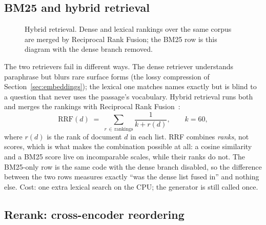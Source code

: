 \subsection{BM25 and hybrid retrieval}
\label{sec:arch-hybrid}

\begin{figure}[t]
\centering
{}
\caption{Hybrid retrieval. Dense and lexical rankings over the same corpus
are merged by Reciprocal Rank Fusion; the BM25 row is this diagram with
the dense branch removed.}
\label{fig:arch-hybrid}
\end{figure}

The two retrievers fail in different ways. The dense retriever understands
paraphrase but blurs rare surface forms (the lossy compression of
Section~\ref{sec:embeddings}); the lexical one matches names exactly but is
blind to a question that never uses the passage's vocabulary. Hybrid
retrieval runs both and merges the rankings with Reciprocal Rank
Fusion~\citep{cormack2009rrf}:
\begin{equation}
\mathrm{RRF}(d) \;=\; \sum_{r \,\in\, \text{rankings}} \frac{1}{k + r(d)},
\qquad k = 60,
\label{eq:rrf}
\end{equation}
where $r(d)$ is the rank of document $d$ in each list. RRF combines
\emph{ranks}, not scores, which is what makes the combination possible at
all: a cosine similarity and a BM25 score live on incomparable scales,
while their ranks do not. The BM25-only row is the same code with the dense
branch disabled, so the difference between the two rows measures exactly
``was the dense list fused in'' and nothing else. Cost: one extra lexical
search on the CPU; the generator is still called once.

\subsection{Rerank: cross-encoder reordering}
\label{sec:arch-rerank}

